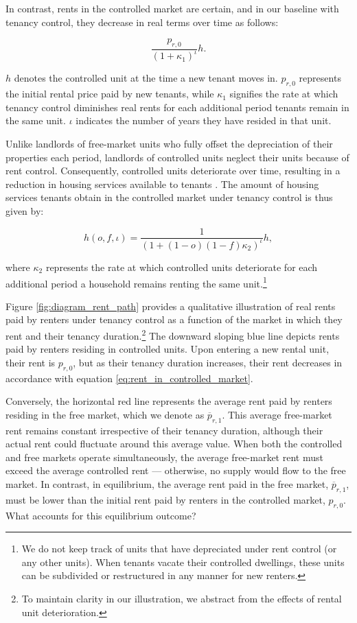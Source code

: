 \documentclass[parskip=full]{article}
\begin{document}
In contrast, rents in the controlled market are certain, and in our baseline with tenancy control, they decrease in real terms over time as follows:

\begin{equation}\label{eq:rent_in_controlled_market}
\frac{p_{r,0}}{(1+\kappa_{1})^{\iota}} h.
\end{equation} 

\noindent $h$ denotes the controlled unit at the time a new tenant moves in. $p_{r,0}$ represents the initial rental price paid by new tenants, while $\kappa_{1}$ signifies the rate at which tenancy control diminishes real rents for each additional period tenants remain in the same unit. $\iota$ indicates the number of years they have resided in that unit.

Unlike landlords of free-market units who fully offset the depreciation of their properties each period, landlords of controlled units neglect their units because of rent control. Consequently, controlled units deteriorate over time, resulting in a reduction in housing services available to tenants \citep{gl-1990,la-2018}. The amount of housing services tenants obtain in the controlled market under tenancy control is thus given by:

\begin{equation}
    h(o,f,\iota)=\frac{1}{(1+(1-o)(1-f)\kappa_{2})^{\iota}} h,
\end{equation}
 
\noindent where $\kappa_{2}$ represents the rate at which controlled units deteriorate for each additional period a household remains renting the same unit.\footnote{We do not keep track of units that have depreciated under rent control (or any other units). When tenants vacate their controlled dwellings, these units can be subdivided or restructured in any manner for new renters.}

Figure \ref{fig:diagram_rent_path} provides a qualitative illustration of real rents paid by renters under tenancy control as a function of the market in which they rent and their tenancy duration.\footnote{To maintain clarity in our illustration, we abstract from the effects of rental unit deterioration.} The downward sloping blue line depicts rents paid by renters residing in controlled units. Upon entering a new rental unit, their rent is $p_{r,0}$, but as their tenancy duration increases, their rent decreases in accordance with equation \eqref{eq:rent_in_controlled_market}. 

Conversely, the horizontal red line represents the average rent paid by renters residing in the free market, which we denote as $\overline{p}_{r,1}$. This average free-market rent remains constant irrespective of their tenancy duration, although their actual rent could fluctuate around this average value. When both the controlled and free markets operate simultaneously, the average free-market rent must exceed the average controlled rent — otherwise, no supply would flow to the free market. In contrast, in equilibrium, the average rent paid in the free market, $\overline{p}_{r,1}$, must be lower than the initial rent paid by renters in the controlled market, $p_{r,0}$. What accounts for this equilibrium outcome?
\end{document}
